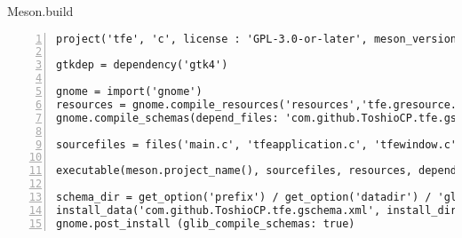 Meson.build

\begin{lstlisting}[numbers=left]
project('tfe', 'c', license : 'GPL-3.0-or-later', meson_version:'>=1.0.1', version: '0.5')

gtkdep = dependency('gtk4')

gnome = import('gnome')
resources = gnome.compile_resources('resources','tfe.gresource.xml')
gnome.compile_schemas(depend_files: 'com.github.ToshioCP.tfe.gschema.xml')

sourcefiles = files('main.c', 'tfeapplication.c', 'tfewindow.c', 'tfepref.c', 'tfealert.c', 'pfd2css.c', '../tfetextview/tfetextview.c')

executable(meson.project_name(), sourcefiles, resources, dependencies: gtkdep, export_dynamic: true, install: true)

schema_dir = get_option('prefix') / get_option('datadir') / 'glib-2.0/schemas/'
install_data('com.github.ToshioCP.tfe.gschema.xml', install_dir: schema_dir)
gnome.post_install (glib_compile_schemas: true)
\end{lstlisting}

